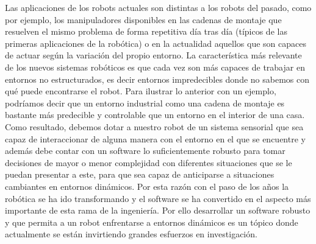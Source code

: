 Las aplicaciones de los robots actuales son distintas a los robots del pasado, como por ejemplo, los manipuladores disponibles en las cadenas de montaje que resuelven el mismo problema de forma repetitiva día tras día (típicos de las primeras aplicaciones de la robótica) o en la actualidad aquellos que son capaces de actuar según la variación del propio entorno. La característica más relevante de los nuevos sistemas robóticos es que cada vez son más capaces de trabajar en entornos no estructurados, es decir entornos impredecibles donde no sabemos con qué puede encontrarse el robot. Para ilustrar lo anterior con un ejemplo, podríamos decir que un entorno industrial como una cadena de montaje es bastante más predecible y controlable que un entorno en el interior de una casa. Como resultado, debemos dotar a nuestro robot de un sistema sensorial que sea capaz de interaccionar de alguna manera con el entorno en el que se encuentre y además debe contar con un software lo suficientemente robusto para tomar decisiones de mayor o menor complejidad con diferentes situaciones que se le puedan presentar a este, para que sea capaz de anticiparse a situaciones cambiantes en entornos dinámicos. Por esta razón con el paso de los años la robótica se ha ido transformando y el software se ha convertido en el aspecto más importante de esta rama de la ingeniería. Por ello desarrollar un software robusto y que permita a un robot enfrentarse a entornos dinámicos es un tópico donde actualmente se están invirtiendo grandes esfuerzos en investigación.
%
%
%
%
%
%
%
%
%
%
%
%
%
%
%
%
%
%
%
%
%
%
%

